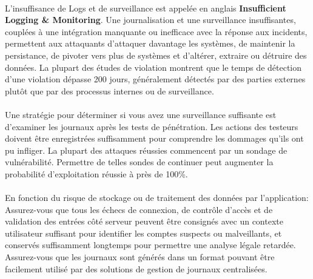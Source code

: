 \begin{enumerate}[label=\roman*)]
		\paragraph{}
		L'insuffisance de Logs et de surveillance est appel\'ee en anglais \textbf{Insufficient Logging \& Monitoring}.
		Une journalisation et une surveillance insuffisantes, couplées à une intégration manquante ou inefficace avec la réponse aux incidents, permettent aux attaquants d'attaquer davantage les systèmes, de maintenir la persistance, de pivoter vers plus de systèmes et d'altérer, extraire ou détruire des données. La plupart des études de violation montrent que le temps de détection d'une violation dépasse 200 jours, généralement détectés par des parties externes plutôt que par des processus internes ou de surveillance.
		\paragraph{}
		Une stratégie pour déterminer si vous avez une surveillance suffisante est d'examiner les journaux après les tests de pénétration. Les actions des testeurs doivent être enregistrées suffisamment pour comprendre les dommages qu'ils ont pu infliger.
		La plupart des attaques réussies commencent par un sondage de vulnérabilité. Permettre de telles sondes de continuer peut augmenter la probabilité d'exploitation réussie à près de 100\%.
		\paragraph{}
		En fonction du risque de stockage ou de traitement des données par l'application:
		Assurez-vous que tous les échecs de connexion, de contrôle d'accès et de validation des entrées côté serveur peuvent être consignés avec un contexte utilisateur suffisant pour identifier les comptes suspects ou malveillants, et conservés suffisamment longtemps pour permettre une analyse légale retardée.
		Assurez-vous que les journaux sont générés dans un format pouvant être facilement utilisé par des solutions de gestion de journaux centralisées.	
	      \end{enumerate}

% 

